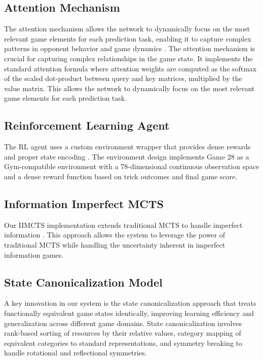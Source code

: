 \documentclass[conference]{IEEEtran}
\begin{document}
\subsection{Attention Mechanism}

The attention mechanism allows the network to dynamically focus on the most relevant game elements for each prediction task, enabling it to capture complex patterns in opponent behavior and game dynamics \cite{vaswani2017attention}.
The attention mechanism is crucial for capturing complex relationships in the game state. It implements the standard attention formula where attention weights are computed as the softmax of the scaled dot-product between query and key matrices, multiplied by the value matrix. This allows the network to dynamically focus on the most relevant game elements for each prediction task.

\subsection{Reinforcement Learning Agent}

The RL agent uses a custom environment wrapper that provides dense rewards and proper state encoding \cite{li2017deep,arulkumaran2017brief}. The environment design implements Game 28 as a Gym-compatible environment with a 78-dimensional continuous observation space and a dense reward function based on trick outcomes and final game score.

\subsection{Information Imperfect MCTS}

Our IIMCTS implementation extends traditional MCTS to handle imperfect information \cite{kowalski2019efficient,lanctot2013monte}. This approach allows the system to leverage the power of traditional MCTS while handling the uncertainty inherent in imperfect information games.


\subsection{State Canonicalization Model}

A key innovation in our system is the state canonicalization approach that treats functionally equivalent game states identically, improving learning efficiency and generalization across different game domains. State canonicalization involves rank-based sorting of resources by their relative values, category mapping of equivalent categories to standard representations, and symmetry breaking to handle rotational and reflectional symmetries.
\end{document}
